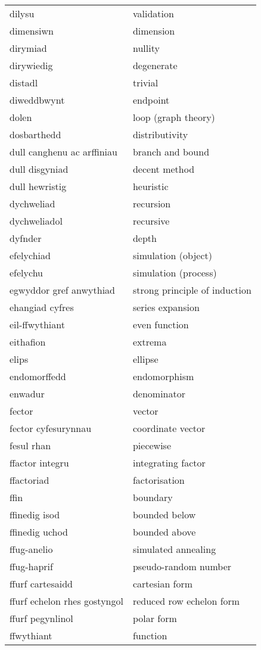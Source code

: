 \begin{supertabular}{p{0.22\textwidth}p{0.22\textwidth}}
dilysu & validation \\
dimensiwn & dimension \\
dirymiad & nullity \\
dirywiedig & degenerate \\
distadl & trivial \\
diweddbwynt & endpoint \\
dolen & loop (graph theory) \\
dosbarthedd & distributivity \\
dull canghenu ac arffiniau & branch and bound \\
dull disgyniad & decent method \\
dull hewristig & heuristic \\
dychweliad & recursion \\
dychweliadol & recursive \\
dyfnder & depth \\
efelychiad & simulation (object) \\
efelychu & simulation (process) \\
egwyddor gref anwythiad & strong principle of induction \\
ehangiad cyfres & series expansion \\
eil-ffwythiant & even function \\
eithafion & extrema \\
elips & ellipse \\
endomorffedd & endomorphism \\
enwadur & denominator \\
fector & vector \\
fector cyfesurynnau & coordinate vector \\
fesul rhan & piecewise \\
ffactor integru & integrating factor \\
ffactoriad & factorisation \\
ffin & boundary \\
ffinedig isod & bounded below \\
ffinedig uchod & bounded above \\
ffug-anelio & simulated annealing \\
ffug-haprif & pseudo-random number \\
ffurf cartesaidd & cartesian form \\
ffurf echelon rhes gostyngol & reduced row echelon form \\
ffurf pegynlinol & polar form \\
ffwythiant & function \\

\end{supertabular}
